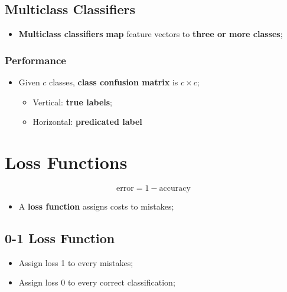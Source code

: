   \subsection{Multiclass Classifiers}
  
    \begin{itemize}
      \item \textbf{Multiclass classifiers} \textbf{map} feature vectors to \textbf{three or more classes};
    \end{itemize}
    
    \subsubsection{Performance}
    
      \begin{itemize}
        \item Given $ c $ classes, \textbf{class confusion matrix} is $ c \times c $;
        \begin{itemize}
          \item Vertical: \textbf{true labels};
          \item Horizontal: \textbf{predicated label}
        \end{itemize}
      \end{itemize}
    
\section{Loss Functions}

  \begin{equation}
    \text{error} = 1 - \text{accuracy}
  \end{equation}

  \begin{itemize}
    \item A \textbf{loss function} assigns costs to mistakes;
  \end{itemize}

  \subsection{0-1 Loss Function}
  
    \begin{itemize}
      \item Assign loss 1 to every mistakes;
      \item Assign loss 0 to every correct classification;
    \end{itemize}
    

